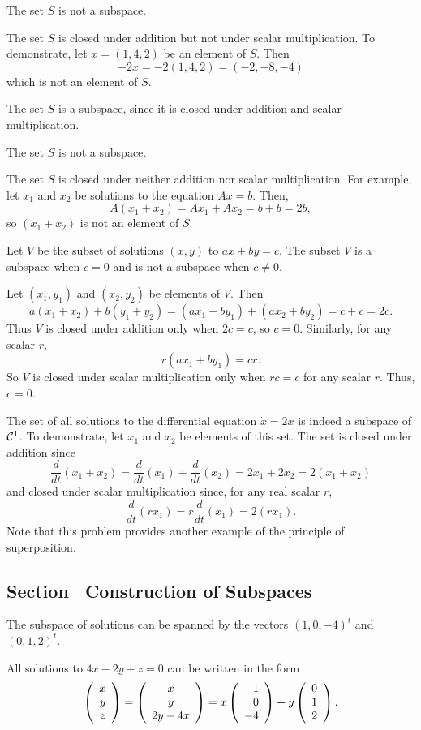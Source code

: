  \ans The set $S$ is not a subspace.

\soln The set $S$ is closed under addition but not under scalar
multiplication.  To demonstrate, let $x = (1,4,2)$ be an element of $S$. 
Then
\[
-2x = -2(1,4,2) = (-2,-8,-4)
\]
which is not an element of $S$.

 The set $S$ is a subspace, since it is closed under
addition and scalar multiplication.

 \ans The set $S$ is not a subspace.

\soln The set $S$ is closed under neither addition nor scalar
multiplication.  For example, let $x_1$ and $x_2$ be solutions to the
equation $Ax = b$.  Then,
\[
A(x_1 + x_2) = Ax_1 + Ax_2 = b + b = 2b,
\]
so $(x_1 + x_2)$ is not an element of $S$.

\ans Let $V$ be the subset of solutions $(x,y)$ to $ax + by = c$.
The subset $V$ is a subspace when $c = 0$ and is not a subspace
when $c \neq 0$. 

\soln Let $(x_1,y_1)$ and $(x_2,y_2)$ be elements of $V$.  Then
\[
a(x_1 + x_2) + b(y_1 + y_2) = (ax_1 + by_1) + (ax_2 + by_2) =
c + c = 2c.
\]
Thus $V$ is closed under addition only when $2c = c$, so $c = 0$.
Similarly, for any scalar $r$,
\[
r(ax_1 + by_1) = cr.
\]
So $V$ is closed under scalar multiplication only when $rc = c$ for
any scalar $r$.  Thus, $c = 0$.

The set of all solutions to the differential equation $\dot{x} = 2x$ is
indeed a subspace of ${\cal C}^1$.  To demonstrate, let $x_1$ and $x_2$
be elements of this set.  The set is closed under addition since
\[
\frac{d}{dt}(x_1 + x_2) = \frac{d}{dt}(x_1) + \frac{d}{dt}(x_2)
= 2x_1 + 2x_2 = 2(x_1 + x_2)
\]
and closed under scalar multiplication since, for any real scalar $r$,
\[
\frac{d}{dt}(rx_1) = r\frac{d}{dt}(x_1) = 2(rx_1).
\]
Note that this problem provides another example of the principle of
superposition.



\newpage
\subsection*{Section~\protect{\ref{S:5.2}} Construction of Subspaces}

 \ans The subspace of solutions can be spanned by the vectors 
$(1,0,-4)^t$ and $(0,1,2)^t$.

\soln All solutions to $4x - 2y + z = 0$ can be written in the form
\[
\left(\begin{array}{r} x \\ y \\ z\end{array}\right) = \left(\begin{array}{c} x \\ y \\ 2y - 4x\end{array}\right)
= x\left(\begin{array}{r} 1 \\ 0 \\ -4\end{array}\right) + y\left(\begin{array}{r} 0 \\ 1 \\ 2\end{array}\right).
\]

